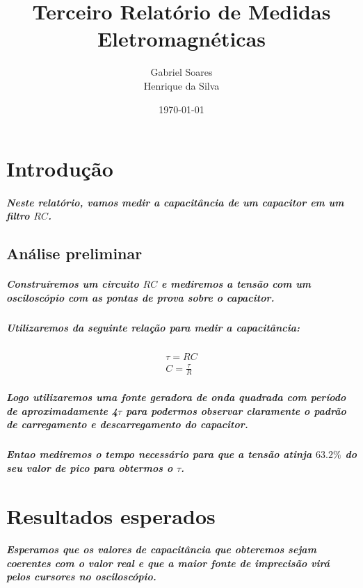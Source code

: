 \documentclass[12pt,twoside, a4paper, twocolumn]{article}
\title{Terceiro Relatório de Medidas Eletromagnéticas}
\author{Gabriel Soares \\ Henrique da Silva}
\date{\today}
\begin{document}
\maketitle
{}
\newpage
\tableofcontents
\newpage



\section{Introdução}


\subparagraph*{Neste relatório, vamos medir a capacitância de um capacitor em um filtro $RC$.}





\subsection{Análise preliminar}

\subparagraph*{Construíremos um circuito $RC$ e mediremos a tensão com um osciloscópio com as pontas de prova sobre o capacitor.}

\subparagraph*{Utilizaremos da seguinte relação para medir a capacitância:}

\begin{equation}
    \begin{aligned}
        \tau = RC \\
        C = \frac{\tau}{R}
    \end{aligned}
\end{equation}

\subparagraph*{Logo utilizaremos uma fonte geradora de onda quadrada com período de aproximadamente 4$\tau$ para podermos observar claramente o padrão de carregamento e descarregamento do capacitor.}

\subparagraph*{Entao mediremos o tempo necessário para que a tensão atinja $63.2\%$ do seu valor de pico para obtermos o $\tau$.}

\section{Resultados esperados}

\subparagraph*{Esperamos que os valores de capacitância que obteremos sejam coerentes com o valor real e que a maior fonte de imprecisão virá pelos cursores no osciloscópio.}
\end{document}
